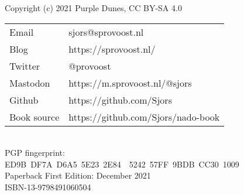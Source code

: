 {\setlength{\parindent}{0cm}
Copyright (c) 2021 Purple Dunes, CC BY-SA 4.0\\

\begin{tabular}{@{} l l }
Email & sjors@sprovoost.nl \\
Blog & https://sprovoost.nl/ \\
Twitter & @provoost \\
Mastodon & https://m.sprovoost.nl/@sjors \\
Github & https://github.com/Sjors \\
Book source & https://github.com/Sjors/nado-book \\
\end{tabular}
\\

PGP fingerprint:\\
ED9B DF7A D6A5 5E23 2E84  5242 57FF 9BDB CC30 1009\\

Paperback First Edition: December 2021\\

ISBN-13-9798491060504\\
}
\newpage
